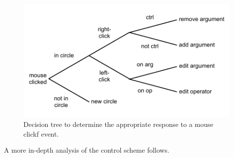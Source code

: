 \documentclass[12pt,twoside,notitlepage,xetex]{report}
\begin{document}
\begin{center}
\begin{figure}[H]
\begin{center}
\includegraphics[width=\textwidth-4cm]{figs/nico_click.pdf}
\end{center}
\caption{Decision tree to determine the appropriate response to a mouse clickf event.}
\end{figure}
\end{center}

A more in-depth analysis of the control scheme follows.
\end{document}
